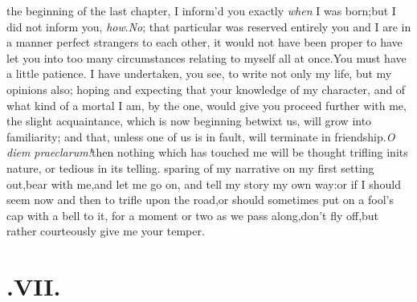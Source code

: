 \documentclass{article}
\begin{document}
 the beginning of the last chapter,
I inform’d you exactly \textit{when} I was born;\tsk but I did not inform
you, \textit{how}.\break\textit{No}; that particular was reserved entirely 
you and I are in a manner
perfect stran\-gers to each other, it would not have been proper to
have let you into too many circumstances relating to myself all at
once.\tsk You must have a little patience. I have undertaken, you see, to write not only my life,
but my opinions also; ho\-ping and expecting that your knowledge
of my character, and of what kind of a
mortal I am, by the one, would give you
proceed further with me, the slight ac\-quaintance, which is now beginning betwixt us,
will grow into familiarity; and that, unless one of us is in fault, will\break
terminate in friendship.\tsk  \textit{O diem
prae\-clarum!}\tsh  then nothing which has touched me will be
thought trifling in\break its nature, or tedious in its telling.\break
{}
sparing of my narrative on my first setting out,\tsk  bear
with me,\tsk  and let me go on, and tell my story my own
way:\tsh  or if I should seem now and then to trifle upon the
road,\tsk  or should sometimes put on a fool’s cap with a
bell to it, for a moment or two as we pass along,\tsk  don’t
fly off,\tsk  but rather courteously give me
your temper.

\null
\section{.\enspace VII.}
\end{document}
